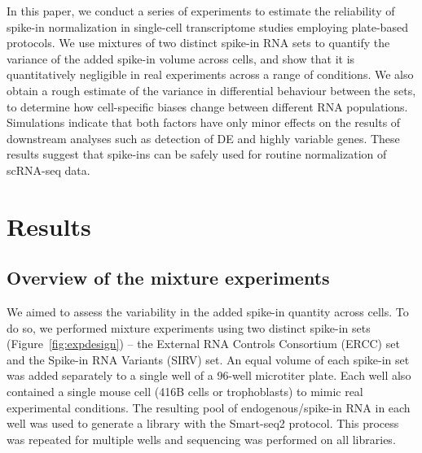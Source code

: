 \documentclass{article}
\begin{document}
In this paper, we conduct a series of experiments to estimate the reliability of spike-in normalization in single-cell transcriptome studies employing plate-based protocols.
We use mixtures of two distinct spike-in RNA sets to quantify the variance of the added spike-in volume across cells, 
and show that it is quantitatively negligible in real experiments across a range of conditions. 
We also obtain a rough estimate of the variance in differential behaviour between the sets, to determine how cell-specific biases change between different RNA populations.
Simulations indicate that both factors have only minor effects on the results of downstream analyses such as detection of DE and highly variable genes.
These results suggest that spike-ins can be safely used for routine normalization of scRNA-seq data.

% 

\section{Results}

\newcommand\variance{\mbox{var}}

\subsection{Overview of the mixture experiments}
We aimed to assess the variability in the added spike-in quantity across cells.
To do so, we performed mixture experiments using two distinct spike-in sets (Figure~\ref{fig:expdesign}) -- the External RNA Controls Consortium (ERCC) set and the Spike-in RNA Variants (SIRV) set.
An equal volume of each spike-in set was added separately to a single well of a 96-well microtiter plate.
Each well also contained a single mouse cell (416B cells or trophoblasts) to mimic real experimental conditions.
The resulting pool of endogenous/spike-in RNA in each well was used to generate a library with the Smart-seq2 protocol.
This process was repeated for multiple wells and sequencing was performed on all libraries.
\end{document}

